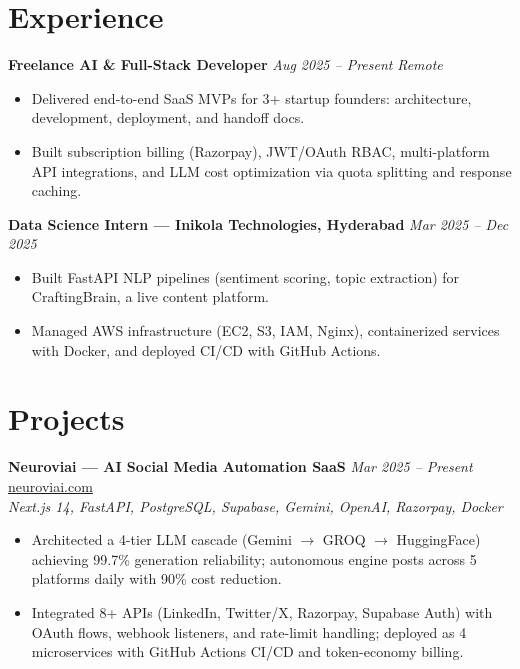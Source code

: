 \documentclass[9.5pt]{article}
\begin{document}
\section*{Experience}

\textbf{Freelance AI \& Full-Stack Developer} \hfill \textit{Aug 2025 -- Present} \quad \textit{Remote}
\begin{itemize}
  \item Delivered end-to-end SaaS MVPs for 3+ startup founders: architecture, development, deployment, and handoff docs.
  \item Built subscription billing (Razorpay), JWT/OAuth RBAC, multi-platform API integrations, and LLM cost optimization via quota splitting and response caching.
\end{itemize}

\vspace{1.5pt}
\textbf{Data Science Intern --- Inikola Technologies, Hyderabad} \hfill \textit{Mar 2025 -- Dec 2025}
\begin{itemize}
  \item Built FastAPI NLP pipelines (sentiment scoring, topic extraction) for CraftingBrain, a live content platform.
  \item Managed AWS infrastructure (EC2, S3, IAM, Nginx), containerized services with Docker, and deployed CI/CD with GitHub Actions.
\end{itemize}

\section*{Projects}

\textbf{Neuroviai --- AI Social Media Automation SaaS} \hfill \textit{Mar 2025 -- Present} \quad \href{https://neuroviai.com}{neuroviai.com}\\
\textit{Next.js 14, FastAPI, PostgreSQL, Supabase, Gemini, OpenAI, Razorpay, Docker}
\begin{itemize}
  \item Architected a 4-tier LLM cascade (Gemini $\rightarrow$ GROQ $\rightarrow$ HuggingFace) achieving 99.7\% generation reliability; autonomous engine posts across 5 platforms daily with 90\% cost reduction.
  \item Integrated 8+ APIs (LinkedIn, Twitter/X, Razorpay, Supabase Auth) with OAuth flows, webhook listeners, and rate-limit handling; deployed as 4 microservices with GitHub Actions CI/CD and token-economy billing.
\end{itemize}
\end{document}
